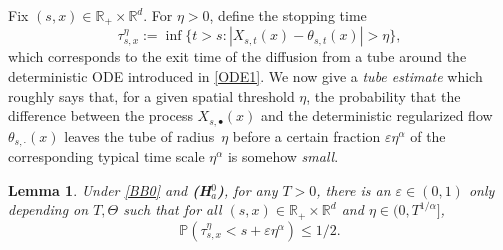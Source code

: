\documentclass[11pt]{article}
\numberwithin{equation}{section}\providecommand{\asymp}{\mathrel{\sim}}
\theoremstyle{plain}
\newtheorem{lemma}[theorem]{Lemma}
\theoremstyle{definition}
\let\eps\varepsilon
\newcommand\mP{\mathbb{P}}
\newcommand\mR{\mathbb{R}}
\newcommand\1{{\mathbf{1}}}
\begin{document}
Fix $(s,x)\in\mR_+\times\mR^d$. For $\eta>0$, define the stopping time
\begin{equation}\label{DH1}
\tau^\eta_{s,x}:=\inf\bigl\{t>s: |X_{s,t}(x)-\theta_{s,t}(x)|>\eta\bigr\},
\end{equation}
which corresponds to the exit time of the diffusion from a tube around the deterministic ODE introduced in \eqref{ODE1}.
We now give a \textit{tube estimate} which roughly says that, for a given spatial threshold $\eta$, the probability that the difference between the process $X_{s,{\scriptscriptstyle\bullet}}(x)$ and the deterministic regularized flow $\theta_{s,\cdot}(x) $ leaves the tube of radius~$\eta $ before a certain fraction $\varepsilon \eta^\alpha $ of the corresponding typical time scale $\eta^\alpha $ is somehow \textit{small}.
\begin{lemma}\label{Le23}
Under \eqref{BB0} and {\bf (H$^0_a$)}, for any $T>0$,
there is an $\eps\in(0,1)$ only depending on $T,\Theta$ such that
for all $(s,x)\in\mR_+\times\mR^d$ and $\eta\in(0,T^{1/\alpha}]$,
\[
\mP(\tau^\eta_{s,x}<s+\eps\eta^\alpha)\leq 1/2.
\]
\end{lemma}
\end{document}
